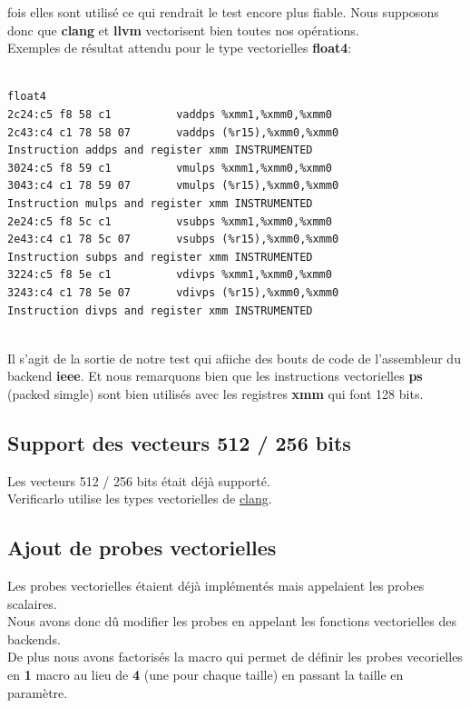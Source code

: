 \documentclass[11pt]{article}
\begin{document}
fois elles sont utilisé ce qui rendrait le test encore plus
fiable. Nous supposons donc que \textbf{clang} et \textbf{llvm} vectorisent bien
toutes nos opérations.
\\ \vspace{5mm}
Exemples de résultat attendu pour le type vectorielles \textbf{float4}:
\\ \vspace{5mm}
\begin{verbatim}

float4
2c24:c5 f8 58 c1          vaddps %xmm1,%xmm0,%xmm0
2c43:c4 c1 78 58 07       vaddps (%r15),%xmm0,%xmm0
Instruction addps and register xmm INSTRUMENTED
3024:c5 f8 59 c1          vmulps %xmm1,%xmm0,%xmm0
3043:c4 c1 78 59 07       vmulps (%r15),%xmm0,%xmm0
Instruction mulps and register xmm INSTRUMENTED
2e24:c5 f8 5c c1          vsubps %xmm1,%xmm0,%xmm0
2e43:c4 c1 78 5c 07       vsubps (%r15),%xmm0,%xmm0
Instruction subps and register xmm INSTRUMENTED
3224:c5 f8 5e c1          vdivps %xmm1,%xmm0,%xmm0
3243:c4 c1 78 5e 07       vdivps (%r15),%xmm0,%xmm0
Instruction divps and register xmm INSTRUMENTED

\end{verbatim}
\\ \vspace{5mm}
Il s'agit de la sortie de notre test qui afiiche des bouts de code de
l'assembleur du backend \textbf{ieee}. Et nous remarquons bien que les instructions
vectorielles \textbf{ps} (packed simgle) sont bien utilisés avec les registres
\textbf{xmm} qui font 128 bits.

\subsection{Support des vecteurs 512 / 256 bits}
\label{sec:orgd19a3ae}

Les vecteurs 512 / 256 bits était déjà supporté.
\\ \vspace{5mm}
Verificarlo utilise les types vectorielles de \href{https://clang.llvm.org/docs/LanguageExtensions.html\#vectors-and-extended-vectors}{clang}.

\subsection{Ajout de probes vectorielles}
\label{sec:org67fb326}

Les probes vectorielles étaient déjà implémentés mais appelaient les
probes scalaires.
\\ \vspace{5mm}
Nous avons donc dû modifier les probes en appelant les fonctions
vectorielles des backends.
\\ \vspace{5mm}
De plus nous avons factorisés la macro qui permet de définir les
probes vecorielles en \textbf{1} macro au lieu de \textbf{4} (une pour chaque
taille) en passant la taille en paramètre.
\end{document}
